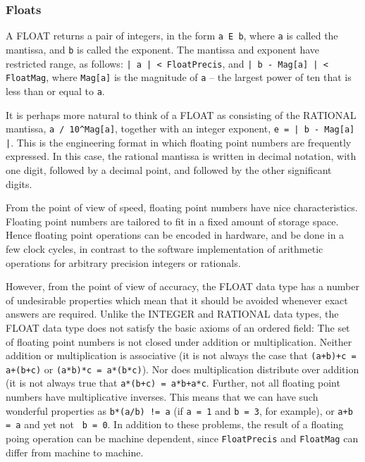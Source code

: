 \subsubsection{Floats}

A FLOAT returns a pair of integers, in the form \verb+a E b+, where
\verb+a+ is called the mantissa, and \verb+b+ is called the exponent.
The mantissa and exponent have restricted range, as follows:  
\verb+| a | < FloatPrecis+, and \verb+| b - Mag[a] | < FloatMag+, where
\verb+Mag[a]+ is the magnitude of \verb+a+ -- the largest power of ten 
that is less than or equal to \verb+a+.  

It is perhaps more natural to think of a FLOAT as consisting of the
RATIONAL mantissa, \verb+a / 10^Mag[a]+, together with an integer
exponent, \verb+e = | b - Mag[a] |+.  This is the engineering format
in which floating point numbers are frequently expressed.  In this
case, the rational mantissa is written in decimal notation, with one
digit, followed by a decimal point, and followed by the other
significant digits.

From the point of view of speed, floating point numbers have nice
characteristics.  Floating point numbers are tailored to fit in a
fixed amount of storage space.  Hence floating point operations can be
encoded in hardware, and be done in a few clock cycles, in contrast to
the software implementation of arithmetic operations for arbitrary
precision integers or rationals.  

However, from the point of view of accuracy, the FLOAT data type has a
number of undesirable properties which mean that it should be avoided
whenever exact answers are required.  Unlike the INTEGER and RATIONAL
data types, the FLOAT data type does not satisfy the basic axioms of
an ordered field: The set of floating point numbers is not closed
under addition or multiplication.  Neither addition or multiplication
is associative (it is not always the case that
\verb&(a+b)+c = a+(b+c)& or 
\verb+(a*b)*c = a*(b*c)+).  Nor does multiplication
distribute over addition (it is not always true that 
\verb&a*(b+c) = a*b+a*c&.  Further, not all floating point numbers have
multiplicative inverses.  This means that we can have such wonderful
properties as \verb+b*(a/b) != a+ (if \verb+a = 1+ and
\verb+b = 3+, for example), or \verb&a+b = a& and yet not \verb+ b = 0+.  In
addition to these problems, the result of a floating poing operation
can be machine dependent, since \verb+FloatPrecis+ and 
\verb+FloatMag+ can differ from machine to machine.


